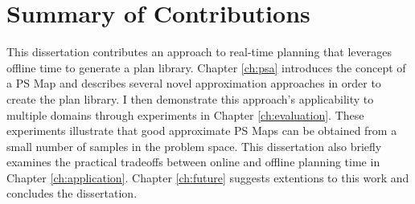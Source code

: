 \section{Summary of Contributions}

This dissertation contributes an approach to real-time planning that leverages offline time to generate a plan library.  Chapter \ref{ch:psa} introduces the concept of a PS Map  and describes several novel approximation approaches in order to create the plan library.  I then demonstrate this approach's applicability to multiple domains through experiments in Chapter \ref{ch:evaluation}.  These experiments illustrate that good approximate PS Maps can be obtained from a small number of samples in the problem space.  This dissertation also briefly examines the practical tradeoffs between online and offline planning time in Chapter \ref{ch:application}.  Chapter \ref{ch:future} suggests extentions to this work and concludes the dissertation.



